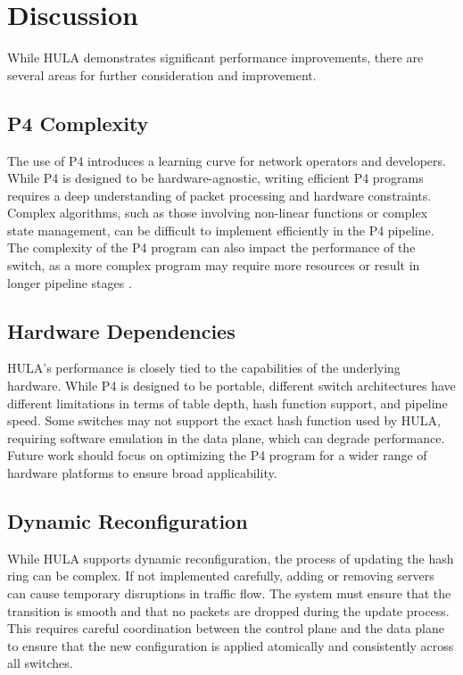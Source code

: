 \documentclass[12pt,a4paper]{article}
\begin{document}
\section{Discussion}

While HULA demonstrates significant performance improvements, there are several areas for further consideration and improvement.

\subsection{P4 Complexity}

The use of P4 introduces a learning curve for network operators and developers. While P4 is designed to be hardware-agnostic, writing efficient P4 programs requires a deep understanding of packet processing and hardware constraints. Complex algorithms, such as those involving non-linear functions or complex state management, can be difficult to implement efficiently in the P4 pipeline. The complexity of the P4 program can also impact the performance of the switch, as a more complex program may require more resources or result in longer pipeline stages \cite{ref24}.

\subsection{Hardware Dependencies}

HULA's performance is closely tied to the capabilities of the underlying hardware. While P4 is designed to be portable, different switch architectures have different limitations in terms of table depth, hash function support, and pipeline speed. Some switches may not support the exact hash function used by HULA, requiring software emulation in the data plane, which can degrade performance. Future work should focus on optimizing the P4 program for a wider range of hardware platforms to ensure broad applicability.

\subsection{Dynamic Reconfiguration}

While HULA supports dynamic reconfiguration, the process of updating the hash ring can be complex. If not implemented carefully, adding or removing servers can cause temporary disruptions in traffic flow. The system must ensure that the transition is smooth and that no packets are dropped during the update process. This requires careful coordination between the control plane and the data plane to ensure that the new configuration is applied atomically and consistently across all switches.
\end{document}
